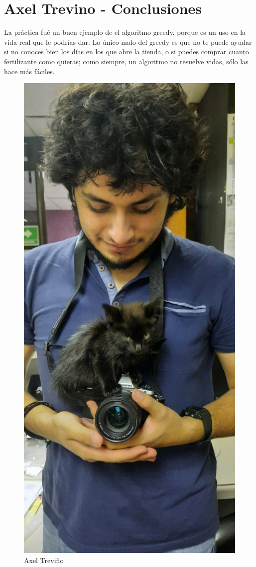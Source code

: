 \newpage
\section{Axel Trevino - Conclusiones}
    La práctica fué un buen ejemplo de el algoritmo greedy, porque es un uso en la vida real que le podrías dar. Lo único malo del greedy es que no te puede ayudar si no conoces bien los días en los que abre la tienda, o si puedes comprar cuanto fertilizante como quieras; como siempre, un algoritmo no resuelve vidas, sólo las hace más fáciles.
    \begin{figure}[htp!]
            \centering
            \includegraphics[width=0.4 \textwidth]{Images/Fotos_Alumnos/axel.jpg}  
            \caption{Axel Treviño}
            \label{fig:my_label2}
        \end{figure}
